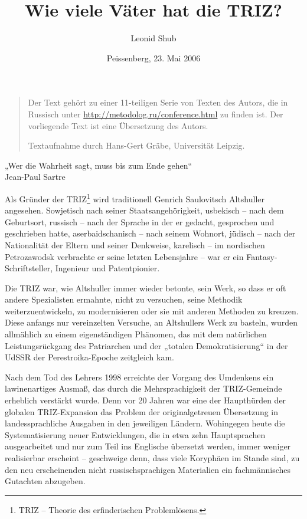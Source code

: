\documentclass[11pt,a4paper]{article}
\title{Wie viele Väter hat die TRIZ? }
\author{Leonid Shub}
\date{Peissenberg, 23. Mai 2006}
\begin{document}
\maketitle

\begin{quote}
  Der Text gehört zu einer 11-teiligen Serie von Texten des Autors, die in
  Russisch unter \url{http://metodolog.ru/conference.html} zu finden ist. Der
  vorliegende Text ist eine Übersetzung des Autors.

  Textaufnahme durch Hans-Gert Gräbe, Universität Leipzig. 
\end{quote}

\begin{flushright}
  „Wer die Wahrheit sagt, muss bis zum Ende gehen“\\ 
  Jean-Paul Sartre 
\end{flushright}

Als Gründer der TRIZ\footnote{TRIZ – Theorie des erfinderischen
  Problemlösens.} wird traditionell Genrich Saulovitsch Altshuller angesehen.
Sowjetisch nach seiner Staatsangehörigkeit, usbekisch – nach dem Geburtsort,
russisch – nach der Sprache in der er gedacht, gesprochen und geschrieben
hatte, aserbaidschanisch – nach seinem Wohnort, jüdisch – nach der
Nationalität der Eltern und seiner Denkweise, karelisch – im nordischen
Petrozawodsk verbrachte er seine letzten Lebensjahre – war er ein
Fantasy-Schriftsteller, Ingenieur und Patentpionier.

Die TRIZ war, wie Altshuller immer wieder betonte, sein Werk, so dass er oft
andere Spezialisten ermahnte, nicht zu versuchen, seine Methodik
weiterzuentwickeln, zu modernisieren oder sie mit anderen Methoden zu
kreuzen. Diese anfangs nur vereinzelten Versuche, an Altshullers Werk zu
basteln, wurden allmählich zu einem eigenständigen Phänomen, das mit dem
natürlichen Leistungsrückgang des Patriarchen und der „totalen
Demokratisierung“ in der UdSSR der Perestroika-Epoche zeitgleich kam.

Nach dem Tod des Lehrers 1998 erreichte der Vorgang des Umdenkens ein
lawinenartiges Ausmaß, das durch die Mehrsprachigkeit der TRIZ-Gemeinde
erheblich verstärkt wurde. Denn vor 20 Jahren war eine der Haupthürden der
globalen TRIZ-Expansion das Problem der originalgetreuen Übersetzung in
landessprachliche Ausgaben in den jeweiligen Ländern.  Wohingegen heute die
Systematisierung neuer Entwicklungen, die in etwa zehn Hauptsprachen
ausgearbeitet und nur zum Teil ins Englische übersetzt werden, immer weniger
realisierbar erscheint – geschweige denn, dass viele Koryphäen im Stande sind,
zu den neu erscheinenden nicht russischsprachigen Materialien ein
fachmännisches Gutachten abzugeben.
\end{document}
